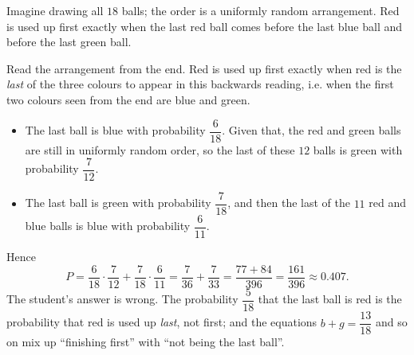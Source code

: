 Imagine drawing all $18$ balls; the order is a uniformly random arrangement. Red is used up first exactly when the last red ball comes before the last blue ball and before the last green ball.

Read the arrangement from the end. Red is used up first exactly when red is the \emph{last} of the three colours to appear in this backwards reading, i.e. when the first two colours seen from the end are blue and green.
\begin{itemize}
\item The last ball is blue with probability $\dfrac{6}{18}$. Given that, the red and green balls are still in uniformly random order, so the last of these $12$ balls is green with probability $\dfrac{7}{12}$.
\item The last ball is green with probability $\dfrac{7}{18}$, and then the last of the $11$ red and blue balls is blue with probability $\dfrac{6}{11}$.
\end{itemize}
Hence
\[
P=\dfrac{6}{18}\cdot\dfrac{7}{12}+\dfrac{7}{18}\cdot\dfrac{6}{11}=\dfrac{7}{36}+\dfrac{7}{33}=\dfrac{77+84}{396}=\boxed{\dfrac{161}{396}}\approx0.407 .
\]
The student's answer is wrong. The probability $\dfrac{5}{18}$ that the last ball is red is the probability that red is used up \emph{last}, not first; and the equations $b+g=\dfrac{13}{18}$ and so on mix up ``finishing first'' with ``not being the last ball''.

